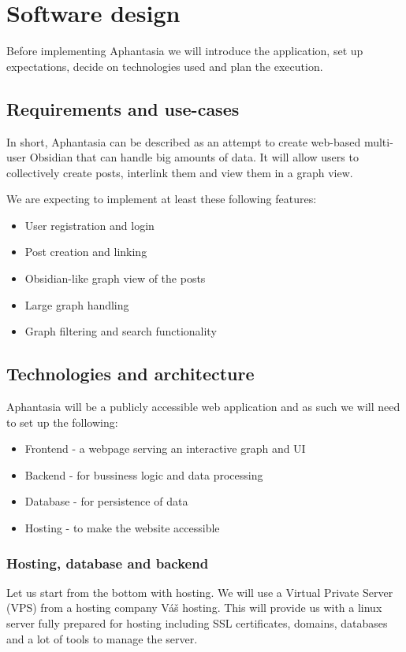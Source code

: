 \chapter{Software design}

Before implementing Aphantasia we will introduce the application,
set up expectations, decide on technologies used and plan the execution.

\section{Requirements and use-cases}

In short, Aphantasia can be described as an attempt to create web-based multi-user Obsidian that can handle big amounts of data.
It will allow users to collectively create posts, interlink them and view them in a graph view.

We are expecting to implement at least these following features:
\begin{itemize}
  \item User registration and login
  \item Post creation and linking
  \item Obsidian-like graph view of the posts 
  \item Large graph handling
  \item Graph filtering and search functionality
\end{itemize}

\section{Technologies and architecture}

Aphantasia will be a publicly accessible web application and as such we will need to set up the following:
\begin{itemize}
  \item Frontend - a webpage serving an interactive graph and UI
  \item Backend - for bussiness logic and data processing
  \item Database - for persistence of data
  \item Hosting - to make the website accessible
\end{itemize}

\subsection{Hosting, database and backend}
Let us start from the bottom with hosting.
We will use a Virtual Private Server (VPS) from a hosting company Váš hosting.
This will provide us with a linux server fully prepared for hosting including
SSL certificates, domains, databases and a lot of tools to manage the server.


